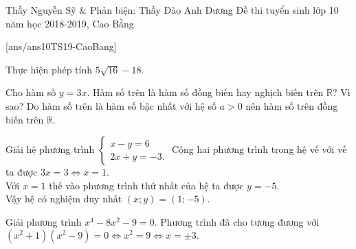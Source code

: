 \begin{name}
{Thầy Nguyễn Sỹ \& Phản biện: Thầy Đào Anh Dương}
{Đề thi tuyển sinh lớp 10 năm học 2018-2019, Cao Bằng }
\end{name}
\setcounter{ex}{0}
[ans/ans10TS19-CaoBang]

\begin{ex}%
	Thực hiện phép tính $5\sqrt{16}-18.$
\end{ex}

\begin{ex}%
	Cho hàm số $y=3x$. Hàm số trên là hàm số đồng biến hay nghịch biến trên $\mathbb{R}$? Vì sao?
	\loigiai
	{ Do hàm số trên là hàm số bậc nhất với hệ số $a>0$ nên hàm số trên đồng biến trên $\mathbb{R}.$
	}
\end{ex}

\begin{ex}%
 Giải hệ phương trình $ \begin{cases}x-y=6\\2x+y=-3. \end{cases}$
	\loigiai
	{ Cộng hai phương trình trong hệ vế với vế ta được $3x=3 \Leftrightarrow x=1.$\\
		Với $x=1$ thế vào phương trình thứ nhất của hệ ta được $y=-5$.\\
		Vậy hệ có nghiệm duy nhất $(x;y)=(1;-5).$
	}
\end{ex}

\begin{ex}%
	Giải phương trình $x^4-8x^2-9=0.$
	\loigiai
	{ Phương trình đã cho tương đương với
	$(x^2+1)(x^2-9)=0\Leftrightarrow x^2=9 \Leftrightarrow x= \pm 3.$
	}
\end{ex}


